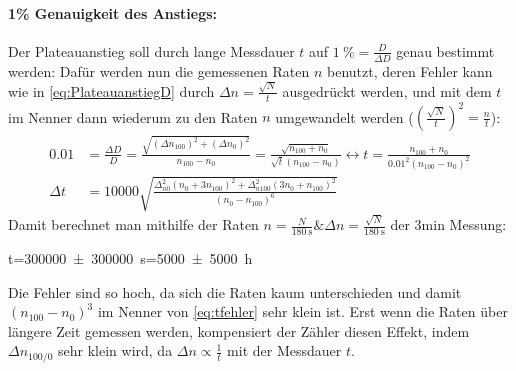 \paragraph{1\% Genauigkeit des Anstiegs:} Der Plateauanstieg soll durch lange Messdauer \(t\) auf \(\qty{1}{\percent}=\frac{D}{\Delta D}\) genau bestimmt werden: Dafür werden nun die gemessenen Raten \(n\) benutzt, deren Fehler kann wie in \cref{eq:PlateauanstiegD} durch \(\Delta n=\frac{\sqrt{N}}{t}\) ausgedrückt werden, und mit dem \(t\) im Nenner dann wiederum zu den Raten \(n\) umgewandelt werden (\(\left(\frac{\sqrt{N}}{t}\right)^2=\frac{n}{t}\)):
\begin{align}
    0.01&=\frac{\Delta D}{D}=\frac{\sqrt{(\Delta n_{100})^2+(\Delta n_{0})^2}}{n_{100}-n_0}=\frac{\sqrt{n_{100}+n_0}}{\sqrt{t}(n_{100}-n_0)}\leftrightarrow t=\frac{n_{100}+n_0}{0.01^2(n_{100}-n_0)^2}\\
    \Delta t&=10000 \sqrt{\frac{\Delta_{n 0}^{2} \left(n_{0} + 3 n_{100}\right)^{2} + \Delta_{n 100}^{2} \left(3 n_{0} + n_{100}\right)^{2}}{\left(n_{0} - n_{100}\right)^{6}}}\label{eq:tfehler}
\end{align} 
Damit berechnet man mithilfe der Raten \(n=\frac{N}{\qty{180}{\s}} \& \Delta n=\frac{\sqrt{N}}{\qty{180}{\s}}\) der 3min Messung: 
\begin{rb}
t=\qty{300000(300000)}{\s}=\qty{5000(5000)}{\hour}
\end{rb} 
Die Fehler sind so hoch, da sich die Raten kaum unterschieden und damit \((n_{100}-n_0)^3\) im Nenner von \cref{eq:tfehler} sehr klein ist. 
Erst wenn die Raten über längere Zeit gemessen werden, kompensiert der Zähler diesen Effekt, indem \(\Delta n_{100/0}\) sehr klein wird, da \(\Delta n\propto\frac{1}{t}\) mit der Messdauer \(t\). 
